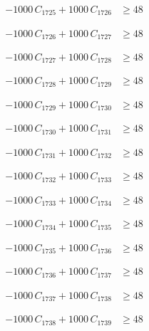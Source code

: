 \documentclass[a4paper,11pt]{article}
\begin{document}
\begin{align}
-1000\,C_{1725} + 1000\,C_{1726} &\geq 48 \nonumber
\end{align}

\begin{align}
-1000\,C_{1726} + 1000\,C_{1727} &\geq 48 \nonumber
\end{align}

\begin{align}
-1000\,C_{1727} + 1000\,C_{1728} &\geq 48 \nonumber
\end{align}

\begin{align}
-1000\,C_{1728} + 1000\,C_{1729} &\geq 48 \nonumber
\end{align}

\begin{align}
-1000\,C_{1729} + 1000\,C_{1730} &\geq 48 \nonumber
\end{align}

\begin{align}
-1000\,C_{1730} + 1000\,C_{1731} &\geq 48 \nonumber
\end{align}

\begin{align}
-1000\,C_{1731} + 1000\,C_{1732} &\geq 48 \nonumber
\end{align}

\begin{align}
-1000\,C_{1732} + 1000\,C_{1733} &\geq 48 \nonumber
\end{align}

\begin{align}
-1000\,C_{1733} + 1000\,C_{1734} &\geq 48 \nonumber
\end{align}

\begin{align}
-1000\,C_{1734} + 1000\,C_{1735} &\geq 48 \nonumber
\end{align}

\begin{align}
-1000\,C_{1735} + 1000\,C_{1736} &\geq 48 \nonumber
\end{align}

\begin{align}
-1000\,C_{1736} + 1000\,C_{1737} &\geq 48 \nonumber
\end{align}

\begin{align}
-1000\,C_{1737} + 1000\,C_{1738} &\geq 48 \nonumber
\end{align}

\begin{align}
-1000\,C_{1738} + 1000\,C_{1739} &\geq 48 \nonumber
\end{align}
\end{document}

